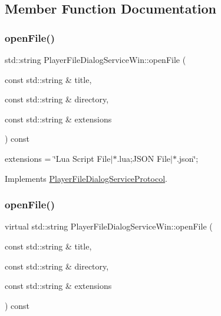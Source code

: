 \subsection{Member Function Documentation}
\mbox{\label{classPlayerFileDialogServiceWin_a1766752253a53e3b0a2c612d915b4453}} 
\subsubsection{\texorpdfstring{open\+File()}{openFile()}\hspace{0.1cm}{\footnotesize\ttfamily [1/2]}}
{\footnotesize\ttfamily std\+::string Player\+File\+Dialog\+Service\+Win\+::open\+File (\begin{DoxyParamCaption}\item[{const std\+::string \&}]{title,  }\item[{const std\+::string \&}]{directory,  }\item[{const std\+::string \&}]{extensions }\end{DoxyParamCaption}) const\hspace{0.3cm}{\ttfamily [virtual]}}

extensions = \char`\"{}\+Lua Script File$\vert$$\ast$.\+lua;\+J\+S\+O\+N File$\vert$$\ast$.\+json\char`\"{}; 

Implements \hyperlink{classPlayerFileDialogServiceProtocol_ac9ef6f506a2ad68bcec05a0029b5cf83}{Player\+File\+Dialog\+Service\+Protocol}.

\mbox{\label{classPlayerFileDialogServiceWin_a110a061dc10c59cba4cb202316e970b4}} 
\subsubsection{\texorpdfstring{open\+File()}{openFile()}\hspace{0.1cm}{\footnotesize\ttfamily [2/2]}}
{\footnotesize\ttfamily virtual std\+::string Player\+File\+Dialog\+Service\+Win\+::open\+File (\begin{DoxyParamCaption}\item[{const std\+::string \&}]{title,  }\item[{const std\+::string \&}]{directory,  }\item[{const std\+::string \&}]{extensions }\end{DoxyParamCaption}) const\hspace{0.3cm}{\ttfamily [virtual]}}

